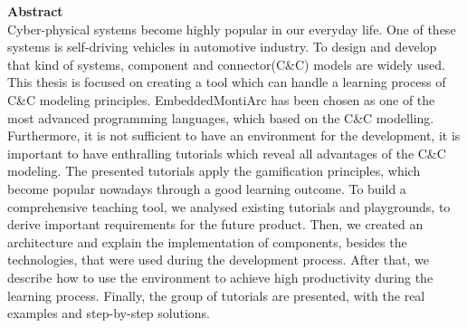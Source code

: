 \vspace*{2cm}

\vspace{10ex}
{\bf\Large Abstract} \\ [1em]
Cyber-physical systems become highly popular in our everyday life. One of these systems is self-driving vehicles in automotive industry. To design and develop that kind of systems, component and connector(C\&C) models are widely used. This thesis is focused on creating a tool which can handle a learning process of C\&C modeling principles. EmbeddedMontiArc has been chosen as one of the most advanced programming languages, which based on the C\&C modelling. Furthermore, it is not sufficient to have an environment for the development, it is important to have enthralling tutorials which reveal all advantages of the C\&C modeling. The presented tutorials apply the gamification principles, which become popular nowadays through a good learning outcome. To build a comprehensive teaching tool, we analysed existing tutorials and playgrounds, to derive important requirements for the future product. Then, we created an architecture and explain the implementation of components, besides the technologies, that were used during the development process. After that, we describe how to use the environment to achieve high productivity during the learning process. Finally, the group of tutorials are presented, with the real examples and step-by-step solutions.
\cleardoublepage
